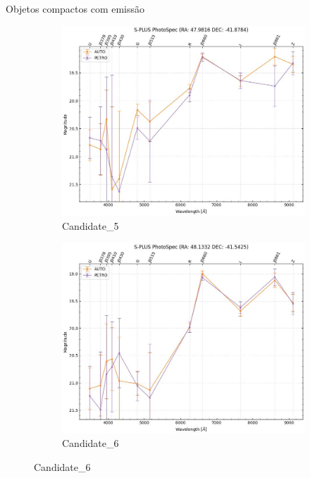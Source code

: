 \begin{frame}[c]{Objetos compactos com emissão}
\begin{figure}[h]
\begin{subfigure}[b]{0.25\textwidth}
        \includegraphics[width=\textwidth]{images/photo_specs/Candidate_5.png}
        \caption{Candidate\_5}
    \end{subfigure}
    \begin{subfigure}[b]{0.25\textwidth}
        \includegraphics[width=\textwidth]{images/photo_specs/Candidate_6.png}
        \caption{Candidate\_6}
    \end{subfigure}
\end{figure}

\end{frame}

